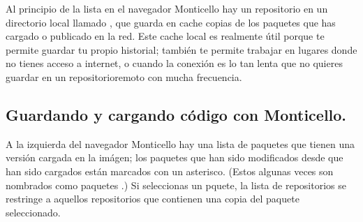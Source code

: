 \documentclass[a4paper,10pt,twoside]{book}
\begin{document}
Al principio de la lista en el navegador Monticello hay un repositorio en un directorio local llamado , que guarda en cache copias de los paquetes que has cargado o publicado en la red. Este cache local es realmente \'util porque te permite guardar tu propio historial; tambi\'en te permite trabajar en lugares donde no tienes acceso a internet, o cuando la conexi\'on es lo tan lenta que no quieres guardar en un repositorioremoto con mucha frecuencia. 

\subsection{Guardando y cargando c\'odigo con Monticello.}

A la izquierda del navegador Monticello hay una lista de paquetes que tienen una versi\'on cargada en la im\'agen; los paquetes que han sido modificados desde que han sido cargados est\'an marcados con un asterisco. (Estos algunas veces son nombrados como paquetes .) Si seleccionas un pquete, la lista de repositorios se restringe a aquellos repositorios que contienen una copia del paquete seleccionado.

\end{document}
